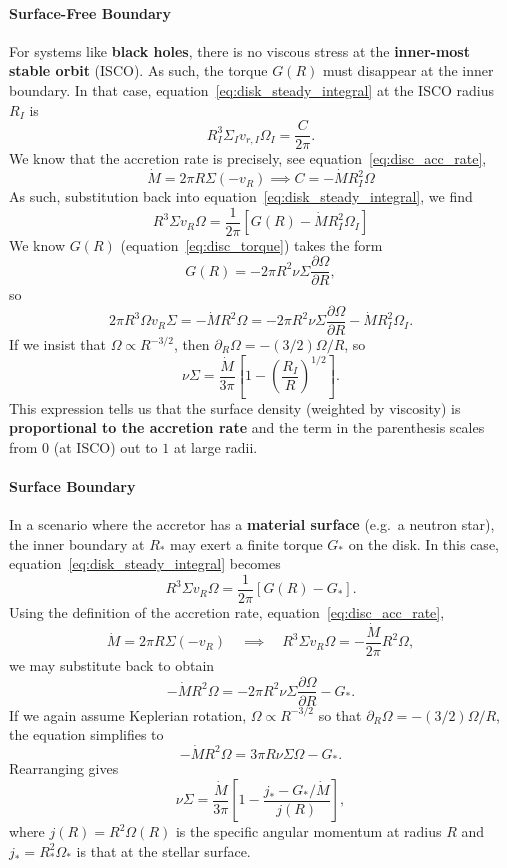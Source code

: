 \paragraph{Surface-Free Boundary}
For systems like \textbf{black holes}, there is no viscous stress at the \textbf{inner-most stable orbit} (ISCO). As such, the torque $G(R)$ must disappear at the inner boundary. In that case, equation~\eqref{eq:disk_steady_integral} at the ISCO radius $R_I$ is
\[
R_{I}^3 \Sigma_I v_{r,I} \Omega_{I} = \frac{C}{2\pi}.
\]
We know that the accretion rate is precisely, see equation~\eqref{eq:disc_acc_rate},
\[
\dot{M} = 2\pi R \Sigma (-v_R) \implies C = - \dot{M} R_I^2 \Omega
\]
As such, substitution back into equation~\eqref{eq:disk_steady_integral}, we find
\[
R^3 \Sigma v_R \Omega = \frac{1}{2\pi}\left[G(R) - \dot{M} R_I^2 \Omega_I\right]
\]
We know $G(R)$ (equation~\ref{eq:disc_torque}) takes the form
\[
G(R) = -2\pi R^2 \nu \Sigma \frac{\partial \Omega}{\partial R},
\]
so
\[
2\pi R^3 \Omega v_R \Sigma = -\dot{M} R^2 \Omega = -2\pi R^2 \nu \Sigma \frac{\partial \Omega}{\partial R} - \dot{M} R_I^2 \Omega_I.
\]
If we insist that $\Omega \propto R^{-3/2}$, then $\partial_R \Omega = -(3/2)\Omega/R$, so
\begin{equation}
    \label{eq:viscous_density_free_surface}
    \boxed{
    \nu\Sigma = \frac{\dot{M}}{3\pi}\left[1 - \left(\frac{R_{I}}{R}\right)^{1/2}\right].
    }
\end{equation}
This expression tells us that the surface density (weighted by viscosity) is \textbf{proportional to the accretion rate} and the term in the parenthesis scales from $0$ (at ISCO) out to $1$ at large radii.
\vspace{10pt}
\paragraph{Surface Boundary}
In a scenario where the accretor has a \textbf{material surface} (e.g.\ a neutron star), the inner boundary at $R_*$ may exert a finite torque $G_*$ on the disk. In this case, equation~\eqref{eq:disk_steady_integral} becomes
\[
R^3 \Sigma v_R \Omega = \frac{1}{2\pi}\left[G(R) - G_*\right].
\]
Using the definition of the accretion rate, equation~\eqref{eq:disc_acc_rate},
\[
\dot{M} = 2\pi R \Sigma (-v_R) \quad \implies \quad R^3 \Sigma v_R \Omega = -\frac{\dot{M}}{2\pi}R^2\Omega,
\]
we may substitute back to obtain
\[
-\dot{M}R^2\Omega = -2\pi R^2 \nu \Sigma \frac{\partial \Omega}{\partial R} - G_*.
\]
If we again assume Keplerian rotation, $\Omega \propto R^{-3/2}$ so that $\partial_R \Omega = -(3/2)\Omega/R$, the equation simplifies to
\[
-\dot{M}R^2\Omega = 3\pi R \nu \Sigma \Omega - G_*.
\]
Rearranging gives
\begin{equation}
    \label{eq:viscous_density_surface}
    \boxed{
    \nu \Sigma = \frac{\dot{M}}{3\pi}\left[1 - \frac{j_* - G_*/\dot{M}}{j(R)}\right],
    }
\end{equation}
where $j(R) = R^2\Omega(R)$ is the specific angular momentum at radius $R$ and $j_* = R_*^2 \Omega_*$ is that at the stellar surface.  

